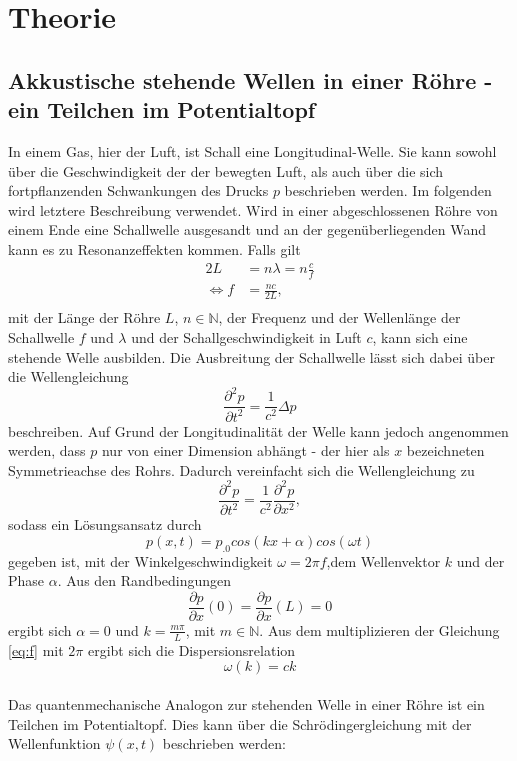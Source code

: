 \section{Theorie}
\label{sec:Theorie}

\subsection{Akkustische stehende Wellen in einer Röhre - ein Teilchen im Potentialtopf}
In einem Gas, hier der Luft, ist Schall eine Longitudinal-Welle. Sie kann sowohl über die Geschwindigkeit der der bewegten Luft, als auch über die sich fortpflanzenden Schwankungen des Drucks $p$ beschrieben werden. Im folgenden wird letztere Beschreibung verwendet.
Wird in einer abgeschlossenen Röhre von einem Ende eine Schallwelle ausgesandt und an der gegenüberliegenden Wand kann es zu Resonanzeffekten kommen. Falls gilt
\begin{align}
2L&=n\lambda=n\frac{c}{f}\\
\Leftrightarrow f&=\frac{n c}{2L},\\\label{eq:f}
\end{align}
mit der Länge der Röhre $L$, $n\in\mathbb{N}$, der Frequenz und der Wellenlänge der Schallwelle $f$ und $\lambda$ und der Schallgeschwindigkeit in Luft $c$, kann sich eine stehende Welle ausbilden.
Die Ausbreitung der Schallwelle lässt sich dabei über die Wellengleichung
\[
\frac{\partial^2 p}{\partial t^2}=\frac{1}{c^2}\Delta p
\]
beschreiben. Auf Grund der Longitudinalität der Welle kann jedoch angenommen werden, dass $p$ nur von einer Dimension abhängt - der hier als $x$ bezeichneten Symmetrieachse des Rohrs. Dadurch vereinfacht sich die Wellengleichung zu
\[
\frac{\partial^2 p}{\partial t^2}=\frac{1}{c^2}\frac{\partial^2 p}{\partial x^2},
\]
sodass ein Lösungsansatz durch
\[
p(x,t)=p_.0cos(k x +\alpha)cos(\omega t)
\]
gegeben ist, mit der Winkelgeschwindigkeit $\omega=2\pi f$,dem Wellenvektor $k$ und der Phase $\alpha$. Aus den Randbedingungen 
\[
\frac{\partial p}{\partial x}(0)=\frac{\partial p}{\partial x}(L)=0
\]
ergibt sich $\alpha=0$ und $k=\frac{m\pi}{L}$, mit $m\in\mathbb{N}$.
Aus dem multiplizieren der Gleichung \eqref{eq:f} mit $2\pi$ ergibt sich die Dispersionsrelation
\begin{equation}
\omega(k)=c k
\end{equation}
\\
\newline
Das quantenmechanische Analogon zur stehenden Welle in einer Röhre ist ein Teilchen im Potentialtopf.
Dies kann über die Schrödingergleichung mit der Wellenfunktion $\psi(x,t)$ beschrieben werden:
